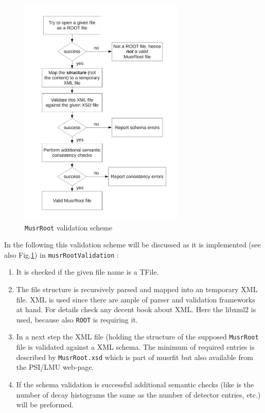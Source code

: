 \documentclass[twoside]{article}
\newcommand{\musrroot}{\texttt{MusrRoot}\xspace}
\newcommand{\rootcern}{\texttt{ROOT}\xspace}
\begin{document}
\begin{figure}[h]
  \centering
  \includegraphics[width=0.7\textwidth]{MusrRootValidationScheme}
  \caption{\musrroot validation scheme}\label{fig:MusrRootValidation}
\end{figure}


In the following this validation scheme will be discussed as it is implemented (see also Fig.\ref{fig:MusrRootValidation}) in \texttt{musrRootValidation} :
\begin{enumerate}
   \item It is checked if the given file name is a TFile.
   \item The file structure is recursively parsed and mapped into an temporary XML file. XML is used since there are ample of parser and validation frameworks at hand. For details check any decent book about XML. Here the libxml2 is used, because also \rootcern is requiring it.
   \item In a next step the XML file (holding the structure of the supposed \musrroot file is validated against a XML schema. The minimum of required entries is described by \texttt{MusrRoot.xsd} which is part of musrfit but also available from the PSI/LMU web-page.
   \item If the schema validation is successful additional semantic checks (like is the number of decay histograms the same as the number of detector entries, etc.) will be preformed. 
\end{enumerate}
\end{document}
